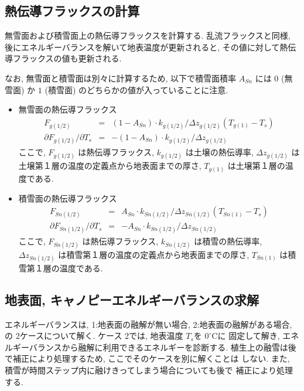 \subsection{熱伝導フラックスの計算}

無雪面および積雪面上の熱伝導フラックスを計算する. 乱流フラックスと同様,
後にエネルギーバランスを解いて地表温度が更新されると, その値に対して熱伝
導フラックスの値も更新される.

なお, 無雪面と積雪面は別々に計算するため, 以下で積雪面積率 $A_{Sn}$ には
$0$ (無雪面) か $1$ (積雪面) のどちらかの値が入っていることに注意.

\begin{itemize}
 \item 無雪面の熱伝導フラックス
\begin{eqnarray}
  F_{g(1/2)} &=& (1 - A_{Sn}) \cdot k_{g(1/2)} / \Delta z_{g(1/2)} (T_{g(1)} - T_s) \\
  \partial F_{g(1/2)}/\partial T_s &=&
  - (1 - A_{Sn}) \cdot k_{g(1/2)} / \Delta z_{g(1/2)}
\end{eqnarray}
ここで, $F_{g(1/2)}$ は熱伝導フラックス, $k_{g(1/2)}$ は土壌の熱伝導率,
$\Delta z_{g(1/2)}$ は土壌第１層の温度の定義点から地表面までの厚さ,
$T_{g(1)}$ は土壌第１層の温度である.
 \item 積雪面の熱伝導フラックス
\begin{eqnarray}
  F_{Sn(1/2)} &=& A_{Sn} \cdot k_{Sn(1/2)} / \Delta z_{Sn(1/2)} (T_{Sn(1)} - T_s)
\label{flux_end} \\
  \partial F_{Sn(1/2)}/\partial T_s &=&
  - A_{Sn} \cdot k_{Sn(1/2)} / \Delta z_{Sn(1/2)}
\end{eqnarray}
ここで, $F_{Sn(1/2)}$ は熱伝導フラックス, $k_{Sn(1/2)}$ は積雪の熱伝導率,
$\Delta z_{Sn(1/2)}$ は積雪第１層の温度の定義点から地表面までの厚さ,
$T_{Sn(1)}$ は積雪第１層の温度である.
\end{itemize}

\subsection{地表面, キャノピーエネルギーバランスの求解}

エネルギーバランスは, 1:地表面の融解が無い場合, 2:地表面の融解がある場合,
の 2ケースについて解く. ケース 2では, 地表温度 $T_s$を $0^{\circ}$Cに
固定して解き, エネルギーバランスから融解に利用できるエネルギーを診断する.
植生上の融雪は後で補正により処理するため, ここでそのケースを別に解くことは
しない.
また, 積雪が時間ステップ内に融けきってしまう場合についても後で
補正により処理する.

